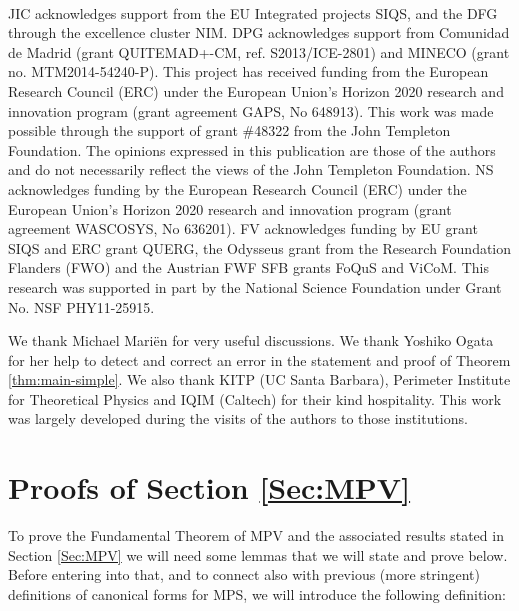 \documentclass{elsarticle}
\begin{document}
\

JIC acknowledges support from the EU Integrated projects SIQS, and the DFG through the excellence cluster NIM.
DPG acknowledges support from
Comunidad de Madrid (grant QUITEMAD+-CM, ref. S2013/ICE-2801) and MINECO (grant no. MTM2014-54240-P).
This project has received funding from the European Research Council (ERC) under the European Union's Horizon 2020 research and innovation program (grant agreement GAPS, No 648913).
This work was made possible through the support of grant \#48322 from the John Templeton Foundation. The opinions expressed in this publication are those of the authors and do not necessarily reflect the views of the John Templeton Foundation.
NS acknowledges funding by the European Research Council (ERC) under the European Union's Horizon 2020 research and innovation program (grant agreement WASCOSYS, No 636201).
FV acknowledges funding by EU grant SIQS and ERC
grant QUERG, the Odysseus grant from the Research Foundation Flanders (FWO)
and the Austrian FWF SFB grants FoQuS and ViCoM.
This research was supported in part by the National Science Foundation under Grant No. NSF PHY11-25915.

We thank Michael Mari\"en for very useful discussions. We thank Yoshiko Ogata for her help to detect and correct an error in the statement and proof of Theorem \ref{thm:main-simple}. We also thank KITP (UC Santa Barbara), Perimeter Institute for Theoretical Physics and IQIM (Caltech) for their kind hospitality. This work was largely developed during the visits of the authors to those institutions.

\appendix


\renewcommand{\thethm}{\Alph{section}.\arabic{thm}}



\section{Proofs of Section \ref{Sec:MPV}}\label{AppendixMPV}

To prove the Fundamental Theorem of MPV and the associated results stated in Section \ref{Sec:MPV} we will need some lemmas that we will state and prove below. Before entering into that, and to connect also with previous (more stringent) definitions of canonical forms for MPS, we will introduce the following definition:
\end{document}
